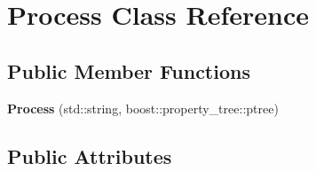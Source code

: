 \hypertarget{classProcess}{}\section{Process Class Reference}
\label{classProcess}
\subsection*{Public Member Functions}
\begin{DoxyCompactItemize}
\item 
\mbox{\label{classProcess_a1c62627941d43a632a2ba72edde8441b}} 
{\bfseries Process} (std\+::string, boost\+::property\+\_\+tree\+::ptree)
\end{DoxyCompactItemize}
\subsection*{Public Attributes}
